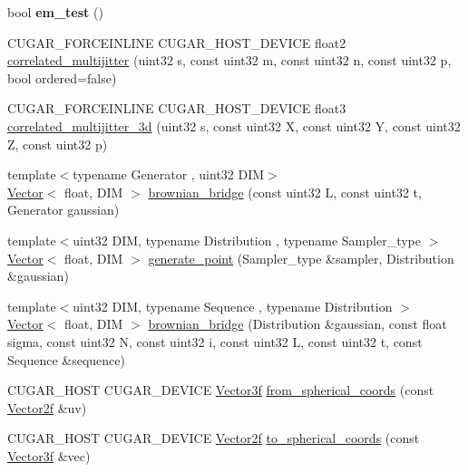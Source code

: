 \begin{DoxyCompactItemize}
\item 
\mbox{\label{namespacecugar_ad0b43fcfb9e50eda8601c1165887f1aa}} 
bool {\bfseries em\+\_\+test} ()
\item 
C\+U\+G\+A\+R\+\_\+\+F\+O\+R\+C\+E\+I\+N\+L\+I\+NE C\+U\+G\+A\+R\+\_\+\+H\+O\+S\+T\+\_\+\+D\+E\+V\+I\+CE float2 \hyperlink{group__multijitter_gaf3f4e367e2cdfe133eae518f82cda8b6}{correlated\+\_\+multijitter} (uint32 s, const uint32 m, const uint32 n, const uint32 p, bool ordered=false)
\item 
C\+U\+G\+A\+R\+\_\+\+F\+O\+R\+C\+E\+I\+N\+L\+I\+NE C\+U\+G\+A\+R\+\_\+\+H\+O\+S\+T\+\_\+\+D\+E\+V\+I\+CE float3 \hyperlink{group__multijitter_ga23bdc35923e1dc33a8d0c35f671b5554}{correlated\+\_\+multijitter\+\_\+3d} (uint32 s, const uint32 X, const uint32 Y, const uint32 Z, const uint32 p)
\item 
{\footnotesize template$<$typename Generator , uint32 D\+IM$>$ }\\\hyperlink{structcugar_1_1_vector}{Vector}$<$ float, D\+IM $>$ \hyperlink{group__processes_ga5c4e54da1f4419033a8ae7f5aa8cdbb2}{brownian\+\_\+bridge} (const uint32 L, const uint32 t, Generator gaussian)
\item 
{\footnotesize template$<$uint32 D\+IM, typename Distribution , typename Sampler\+\_\+type $>$ }\\\hyperlink{structcugar_1_1_vector}{Vector}$<$ float, D\+IM $>$ \hyperlink{group__processes_ga9f3fe90d8a07d266c41f239963b83644}{generate\+\_\+point} (Sampler\+\_\+type \&sampler, Distribution \&gaussian)
\item 
{\footnotesize template$<$uint32 D\+IM, typename Sequence , typename Distribution $>$ }\\\hyperlink{structcugar_1_1_vector}{Vector}$<$ float, D\+IM $>$ \hyperlink{group__processes_ga804d942e70bf4d755991fc3393004e8e}{brownian\+\_\+bridge} (Distribution \&gaussian, const float sigma, const uint32 N, const uint32 i, const uint32 L, const uint32 t, const Sequence \&sequence)
\item 
C\+U\+G\+A\+R\+\_\+\+H\+O\+ST C\+U\+G\+A\+R\+\_\+\+D\+E\+V\+I\+CE \hyperlink{structcugar_1_1_vector}{Vector3f} \hyperlink{group__spherical__mappings_gaa4a68b633ea01fccb331d1a47a8ca8d4}{from\+\_\+spherical\+\_\+coords} (const \hyperlink{structcugar_1_1_vector}{Vector2f} \&uv)
\item 
C\+U\+G\+A\+R\+\_\+\+H\+O\+ST C\+U\+G\+A\+R\+\_\+\+D\+E\+V\+I\+CE \hyperlink{structcugar_1_1_vector}{Vector2f} \hyperlink{group__spherical__mappings_ga180b90ffc2cc3cfcfe63e911ea51a1ab}{to\+\_\+spherical\+\_\+coords} (const \hyperlink{structcugar_1_1_vector}{Vector3f} \&vec)

\end{DoxyCompactItemize}
